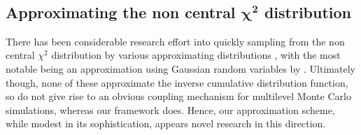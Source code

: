 \documentclass[manuscript,review]{acmart}
\begin{document}
\begin{table}[htb]
\hfil
{}\hfil
{}\hfil\\[0em]
\end{table}

\subsection{Approximating the non central \texorpdfstring{$ \bm{\chi^2} $}{chi-squared} distribution}

There has been considerable research effort into quickly sampling from the non central $ \chi^2 $ distribution by various approximating distributions \citep{johnson1995continuous,sankaran1959non,abdel1954approximate,wilson1931distribution,hoaglin1977direct,shea1991algorithm,best1975algorithm,rice1968uniform}, with the most notable being an approximation using Gaussian random variables by \citet{abdel1954approximate}. Ultimately though, none of these approximate the inverse cumulative distribution function, so do not give rise to an obvious coupling mechanism for multilevel Monte Carlo simulations, whereas our framework does. Hence, our approximation scheme, while modest in its sophistication, appears novel research in this direction.
\end{document}
